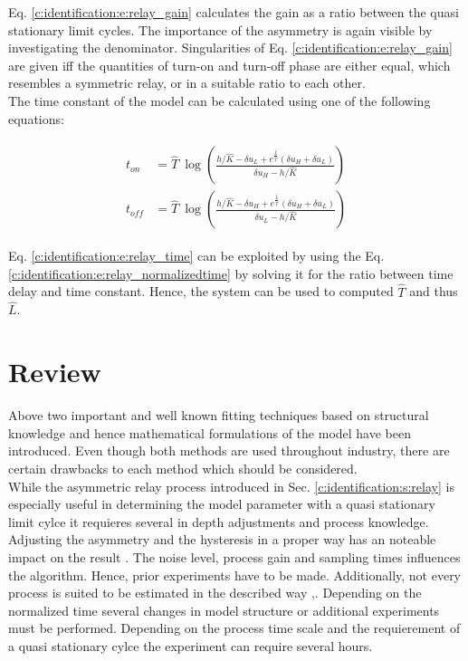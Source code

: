 Eq. \ref{c:identification:e:relay_gain} calculates the gain as a ratio between the quasi stationary limit cycles. The importance of the asymmetry is again visible by investigating the denominator. Singularities of Eq. \ref{c:identification:e:relay_gain} are given iff the quantities of turn-on and turn-off phase are either equal, which resembles a symmetric relay, or in a suitable ratio to each other.\\

The time constant of the model can be calculated using one of the following equations:

\begin{align}
\begin{split}
t_{on} &= \hat{T}~ \log\left( \frac{h/\hat{K}-\delta u_L + e^\frac{\hat{L}}{\hat{T}} \left(\delta u_H + \delta u_L \right) }{\delta u_H - h/\hat{K}}\right) \\
t_{off} &= \hat{T}~  \log\left( \frac{h/\hat{K}-\delta u_H + e^\frac{\hat{L}}{\hat{T}} \left(\delta u_H + \delta u_L \right) }{\delta u_L - h/\hat{K}}\right) 
\end{split}
\label{c:identification:e:relay_time}
\end{align}

Eq. \ref{c:identification:e:relay_time} can be exploited by using the Eq. \ref{c:identification:e:relay_normalizedtime} by solving it for the ratio between time delay and time constant. Hence, the system can be used to computed $\hat{T}$ and thus $\hat{L}$. 

\section{Review}
\label{c:identification:s:review}

Above two important and well known fitting techniques based on structural knowledge and hence mathematical formulations of the model have been introduced. Even though both methods are used throughout industry, there are certain drawbacks to each method which should be considered.\\

While the asymmetric relay process introduced in Sec. \ref{c:identification:s:relay} is especially useful in determining the model parameter with a quasi stationary limit cylce it requieres several in depth adjustments and process knowledge. Adjusting the asymmetry and the hysteresis in a proper way has an noteable impact on the result \cite{Berner2016a}. The noise level, process gain and sampling times influences the algorithm. Hence, prior experiments have to be made. Additionally, not every process is suited to be estimated in the described way \cite{Berner2016a},\cite{Berner2015}. Depending on the normalized time several changes in model structure or additional experiments must be performed. Depending on the process time scale and the requierement of a quasi stationary cylce the experiment can require several hours.\\

